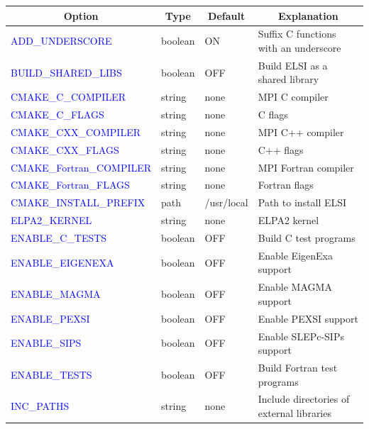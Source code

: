 \documentclass{report}
\begin{document}
\begin{tabular}[]{|p{50mm}|p{15mm}|p{20mm}|p{80mm}|}
\hline
\multicolumn{1}{|c|}{\textbf{Option}} & \multicolumn{1}{c|}{\textbf{Type}} & \multicolumn{1}{c|}{\textbf{Default}} & \multicolumn{1}{c|}{\textbf{Explanation}}\\
\hline
\textcolor{blue}{ADD\_UNDERSCORE}          & boolean & ON          & Suffix C functions with an underscore\\
\hline
\textcolor{blue}{BUILD\_SHARED\_LIBS}      & boolean & OFF         & Build ELSI as a shared library\\
\hline
\textcolor{blue}{CMAKE\_C\_COMPILER}       & string  & none        & MPI C compiler\\
\hline
\textcolor{blue}{CMAKE\_C\_FLAGS}          & string  & none        & C flags\\
\hline
\textcolor{blue}{CMAKE\_CXX\_COMPILER}     & string  & none        & MPI C++ compiler\\
\hline
\textcolor{blue}{CMAKE\_CXX\_FLAGS}        & string  & none        & C++ flags\\
\hline
\textcolor{blue}{CMAKE\_Fortran\_COMPILER} & string  & none        & MPI Fortran compiler\\
\hline
\textcolor{blue}{CMAKE\_Fortran\_FLAGS}    & string  & none        & Fortran flags\\
\hline
\textcolor{blue}{CMAKE\_INSTALL\_PREFIX}   & path    & /usr/local  & Path to install ELSI\\
\hline
\textcolor{blue}{ELPA2\_KERNEL}            & string  & none        & ELPA2 kernel\\
\hline
\textcolor{blue}{ENABLE\_C\_TESTS}         & boolean & OFF         & Build C test programs\\
\hline
\textcolor{blue}{ENABLE\_EIGENEXA}         & boolean & OFF         & Enable EigenExa support\\
\hline
\textcolor{blue}{ENABLE\_MAGMA}            & boolean & OFF         & Enable MAGMA support\\
\hline
\textcolor{blue}{ENABLE\_PEXSI}            & boolean & OFF         & Enable PEXSI support\\
\hline
\textcolor{blue}{ENABLE\_SIPS}             & boolean & OFF         & Enable SLEPc-SIPs support\\
\hline
\textcolor{blue}{ENABLE\_TESTS}            & boolean & OFF         & Build Fortran test programs\\
\hline
\textcolor{blue}{INC\_PATHS}               & string  & none        & Include directories of external libraries\\

\end{tabular}
\end{document}
